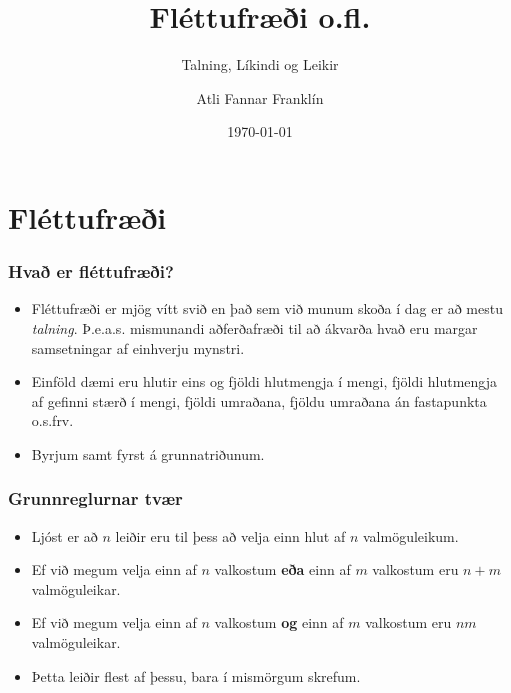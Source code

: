 \documentclass{beamer}
\title{Fléttufræði o.fl.}
\subtitle{Talning, Líkindi og Leikir}
\author{Atli Fannar Franklín}
\date{\today}
\begin{document}
\frame{\titlepage}

\section[Fléttufræði]{Fléttufræði}

\begin{frame}
\frametitle{Hvað er fléttufræði?}

\begin{itemize}

\item<1-> Fléttufræði er mjög vítt svið en það sem við munum skoða í dag er að mestu \textit{talning}. Þ.e.a.s. mismunandi aðferðafræði til að ákvarða hvað eru margar samsetningar af einhverju mynstri.

\item<2-> Einföld dæmi eru hlutir eins og fjöldi hlutmengja í mengi, fjöldi hlutmengja af gefinni stærð í mengi, fjöldi umraðana, fjöldu umraðana án fastapunkta o.s.frv.

\item<3-> Byrjum samt fyrst á grunnatriðunum.

\end{itemize}

\end{frame}

\begin{frame}
\frametitle{Grunnreglurnar tvær}

\begin{itemize}

\item<1-> Ljóst er að $n$ leiðir eru til þess að velja einn hlut af $n$ valmöguleikum.

\item<2-> Ef við megum velja einn af $n$ valkostum \textbf{eða} einn af $m$ valkostum eru $n + m$ valmöguleikar.

\item<3-> Ef við megum velja einn af $n$ valkostum \textbf{og} einn af $m$ valkostum eru $nm$ valmöguleikar.

\item<4-> Þetta leiðir flest af þessu, bara í mismörgum skrefum.

\end{itemize}

\end{frame}
\end{document}
